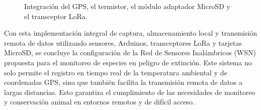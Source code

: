 \begin{itemize}
\begin{figure}[H]
    \centering
    \quad
    \caption{Integración del GPS, el termistor, el módulo adaptador MicroSD y el transceptor LoRa.}
    \label{fig:lora-memoria-img}
\end{figure}

\end{itemize}
Con esta implementación integral de captura, almacenamiento local y transmisión remota de datos utilizando sensores, Arduinos, transceptores LoRa y tarjetas MicroSD, se concluye la configuración de la Red de Sensores Inalámbricos (WSN) propuesta para el monitoreo de especies en peligro de extinción. Este sistema no solo permite el registro en tiempo real de la temperatura ambiental y de coordenadas GPS, sino que también facilita la transmisión remota de datos a largas distancias. Esto garantiza el cumplimiento de las necesidades de monitoreo y conservación animal en entornos remotos y de difícil acceso.

\newpage
